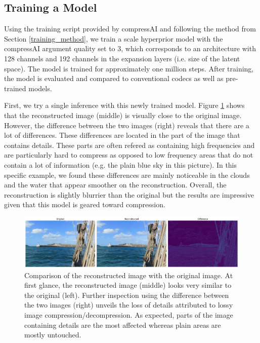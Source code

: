 \subsection{Training a Model}
Using the training script provided by compressAI and following the method from Section \ref{training_method}, we train a scale hyperprior model with the compressAI argument \textsf{quality} set to 3, which corresponds to an architecture with 128 channels and 192 channels in the expansion layers (i.e. size of the latent space). The model is trained for approximately one million steps. After training, the model is evaluated and compared to conventional codecs as well as pre-trained models.

First, we try a single inference with this newly trained model. Figure \ref{balle_repro_1} shows that the reconstructed image (middle) is visually close to the original image. However, the difference between the two images (right) reveals that there are a lot of differences. These differences are located in the part of the image that contains details. These parts are often refered as containing high frequencies and are particularly hard to compress as opposed to low frequency areas that do not contain a lot of information (e.g. the plain blue sky in this picture). In this specific example, we found these differences are mainly noticeable in the clouds and the water that appear smoother on the reconstruction. Overall, the reconstruction is slightly blurrier than the original but the results are impressive given that this model is geared toward compression.

\begin{figure}
    \centering
    \includegraphics[width=15cm]{img/balle_repro_diff.png}
    \caption[Comparison of the reconstructed image with the original image.]{Comparison of the reconstructed image with the original image. At first glance, the reconstructed image (middle) looks very similar to the original (left). Further inspection using the difference between the two images (right) unveils the loss of details attributed to lossy image compression/decompression. As expected, parts of the image containing details are the most affected whereas plain areas are mostly untouched.}
    \label{balle_repro_1}
\end{figure}

